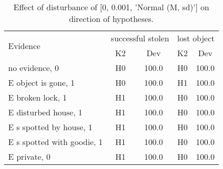 \begin{table}\begin{tabular}{l|cc|cc}\toprule\multirow{2}{*}{Evidence} & \multicolumn{2}{c}{successful stolen}& \multicolumn{2}{c}{lost object}\\& {K2} & {Dev}& {K2} & {Dev}\\\midrule
no evidence, 0 & H0&100.0&H0&100.0\\E object is gone, 1 & H0&100.0&H1&100.0\\E broken lock, 1 & H1&100.0&H0&100.0\\E disturbed house, 1 & H1&100.0&H0&100.0\\E s spotted by house, 1 & H1&100.0&H0&100.0\\E s spotted with goodie, 1 & H1&100.0&H0&100.0\\E private, 0 & H1&100.0&H0&100.0\\\bottomrule\end{tabular}\caption{Effect of disturbance of [0, 0.001, 'Normal (M, sd)'] on direction of hypotheses.}\end{table}